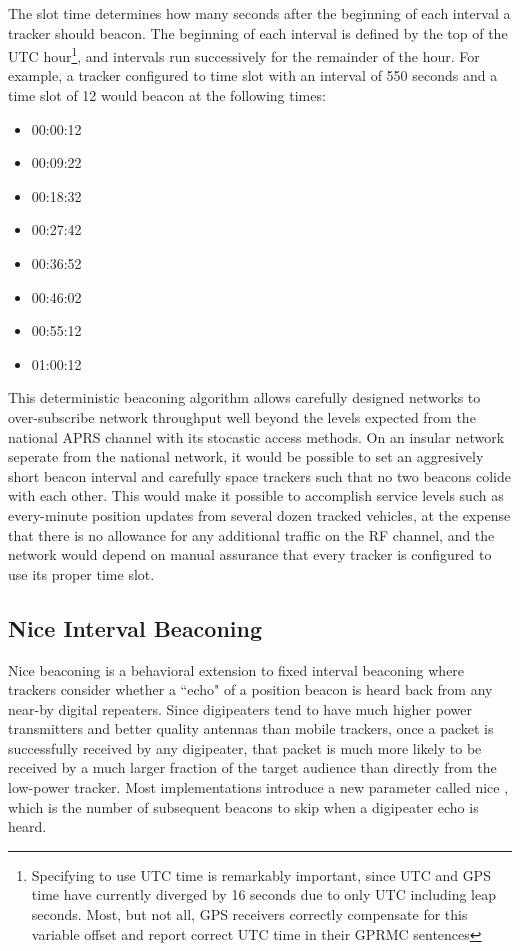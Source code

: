 The slot time determines how many seconds after the beginning of each interval
a tracker should beacon. The beginning of each interval is defined by the top of
the UTC hour\footnote{Specifying to use UTC time is remarkably 
	important, since UTC and GPS time have currently diverged by 16 seconds due to
	only UTC including leap seconds. Most, but not all, GPS receivers correctly
	compensate for this variable offset and report correct UTC time in their
GPRMC sentences}, and intervals run successively for the remainder of the hour.
For example, a tracker configured to time slot with an interval of 550 seconds and
a time slot of 12 would beacon at the following times:
\begin{itemize}
\item 00:00:12
\item 00:09:22
\item 00:18:32
\item 00:27:42
\item 00:36:52
\item 00:46:02
\item 00:55:12
\item 01:00:12
\end{itemize}

This deterministic beaconing algorithm allows carefully designed networks to 
over-subscribe network throughput well beyond the levels expected from 
the national APRS channel with its stocastic access methods. 
On an insular network seperate from the national
network, it would be possible to set an aggresively short beacon interval and 
carefully space trackers such that no two beacons colide with each other. 
This would make it possible to accomplish service levels such as
every-minute position updates from several dozen tracked vehicles, 
at the expense that there is no allowance for any additional traffic 
on the RF channel, and the network would depend on manual 
assurance that every tracker is configured to use its proper time slot.

\subsection{Nice Interval Beaconing}

Nice beaconing is a behavioral extension to fixed interval beaconing 
where trackers consider whether a ``echo"
of a position beacon is heard back from any near-by digital repeaters.
Since digipeaters tend to have much higher power transmitters and better quality
antennas than mobile trackers, once a packet is successfully received by any 
digipeater, that packet is much more likely to be received by a much larger
fraction of the target audience than directly from the low-power tracker. 
Most implementations introduce a new parameter
called nice \cite[p.~38]{ot3manual}, 
which is the number of subsequent beacons to skip when a digipeater echo is heard.

